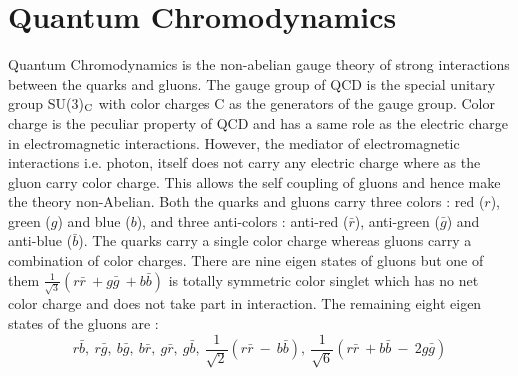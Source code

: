 \section{Quantum Chromodynamics}
Quantum Chromodynamics \cite{Ellis:1991qj, Halzen:1984mc} is the non-abelian gauge theory of strong interactions between the quarks and gluons. The gauge group of QCD is the special unitary group SU(3)$_{\rm C}$ with color charges C as the generators of the gauge group. Color charge is the peculiar property of QCD and has a same role as the electric charge in electromagnetic interactions. However, the mediator of electromagnetic interactions i.e. photon, itself does not carry any electric charge where as the gluon carry color charge. This allows the self coupling of gluons and hence make the theory non-Abelian. Both the quarks and gluons carry three colors : red ($r$), green ($g$) and blue ($b$), and three anti-colors : anti-red ($\bar{r}$), anti-green ($\bar{g}$) and anti-blue ($\bar{b}$). The quarks carry a single color charge whereas gluons carry a combination of color charges. There are nine eigen states of gluons but one of them $\frac{1}{\sqrt{3}}(r\bar{r}~\plus g\bar{g}~\plus b\bar{b})$ is totally symmetric color singlet which has no net color charge and does not take part in interaction. The remaining eight eigen states of the gluons are :
\begin{equation}
r\bar{b},~r\bar{g},~b\bar{g},~b\bar{r},~g\bar{r},~g\bar{b},~\frac{1}{\sqrt{2}}(r\bar{r}~-~b\bar{b}),~\frac{1}{\sqrt{6}}(r\bar{r}~\plus b\bar{b}~-~2g\bar{g}) 
\end{equation}

